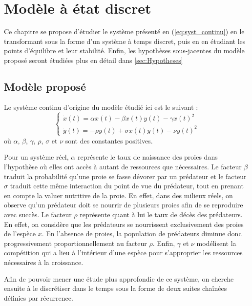 \chapter{Modèle à état discret}
\label{ch:modele_discret}

Ce chapitre se propose d'étudier le système présenté en (\ref{eq:syst_continu}) en le transformant sous la forme d'un système à temps discret, puis en en étudiant les points d'équilibre et leur stabilité. Enfin, les hypothèses sous-jacentes du modèle proposé seront étudiées plus en détail dans \ref{sec:Hypotheses}

\section{Modèle proposé}

Le système continu d'origine du modèle étudié ici est le suivant :
\begin{equation}
    \label{eq:syst_continu}
    \begin{cases}
        \dot{x}(t) = \alpha x(t) - \beta x(t) y(t) - \gamma x(t)^2 \\
        \dot{y}(t) = - \rho y(t) + \sigma x(t) y(t) - \nu y(t)^2
    \end{cases}
\end{equation}
où $\alpha$, $\beta$, $\gamma$, $\rho$, $\sigma$ et $\nu$ sont des constantes positives.

Pour un système réel, $\alpha$ représente le taux de naissance des proies dans l'hypothèse où elles ont accès à autant de ressources que nécessaires.
Le facteur $\beta$ traduit la probabilité qu'une proie se fasse dévorer par un prédateur et le facteur $\sigma$ traduit cette même interaction du point de vue du prédateur, tout en prenant en compte la valuer nutritive de la proie. En effet, dans des milieux réels, on observe qu'un prédateur doit se nourrir de plusieurs proies afin de se reproduire avec succès.
Le facteur $\rho$ représente quant à lui le taux de décès des prédateurs. En effet, on considère que les prédateurs se nourrissent exclusivement des proies de l'espèce $x$. En l'absence de proies, la population de prédateurs diminue donc progressivement proportionnellement au facteur $\rho$.
Enfin, $\gamma$ et $\nu$ modélisent la compétition qui a lieu à l'intérieur d'une espèce pour s'approprier les ressources nécessaires à la croissance.

Afin de pouvoir mener une étude plus approfondie de ce système, on cherche ensuite à le discrétiser dans le temps sous la forme de deux suites chaînées définies par récurrence.

